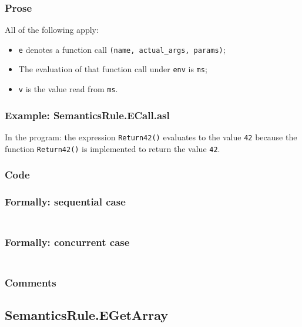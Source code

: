 \documentclass{book}
\begin{document}
  \subsubsection{Prose}
  All of the following apply:
  \begin{itemize}
  \item \texttt{e} denotes a function call \texttt{(name, actual\_args, params)};
  \item The evaluation of that function call under \texttt{env} is \texttt{ms};
  \item \texttt{v} is the value read from \texttt{ms}.
  \end{itemize}

  \subsubsection{Example: SemanticsRule.ECall.asl}
    In the program:
    the expression \texttt{Return42()} evaluates to the value \texttt{42} because the
    function \texttt{Return42()} is implemented to return the value \texttt{42}.

  \subsubsection{Code}

  \subsubsection{Formally: sequential case}
  \begin{align}
  \end{align} 

  \subsubsection{Formally: concurrent case}
  \begin{align}
  \end{align} 

  \subsubsection{Comments}

\subsection{SemanticsRule.EGetArray \label{sec:SemanticsRule.EGetArray}}
\end{document}
